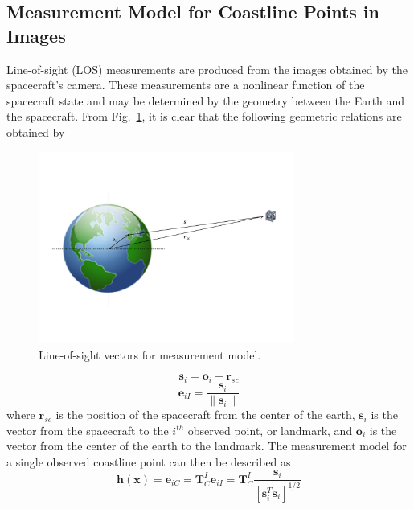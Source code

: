 \documentclass[]{aiaa-tc}%
\begin{document}

\subsection{Measurement Model for Coastline Points in Images} \label{ref:MeasModel}
Line-of-sight (LOS) measurements are produced from the images obtained by the spacecraft's camera.  These measurements are a nonlinear function of the spacecraft state and may be determined by the geometry between the Earth and the spacecraft.  From Fig.~\ref{fig:LOSgeometry}, it is clear that the following geometric relations are obtained by
\begin{figure}[t!]
	\centering
	\includegraphics[width=0.75\textwidth,trim=0.8in 1.5in 0.3in 1in,clip]{LOSgeometry} %
	\caption{Line-of-sight vectors for measurement model.}
	\label{fig:LOSgeometry}
\end{figure}
\begin{equation} \label{eq:s}
\textbf{s}_i=\textbf{o}_i-\textbf{r}_{sc}
\end{equation}
%
\begin{equation} \label{eq:eii}
\textbf{e}_{iI}=\frac{\textbf{s}_i}{\|\textbf{s}_i\|}
\end{equation}
%
where $\textbf{r}_{sc}$ is the position of the spacecraft from the center of the earth, $\textbf{s}_i$ is the vector from the spacecraft to the $i^{th}$ observed point, or landmark, and $\textbf{o}_i$ is the vector from the center of the earth to the landmark.  The measurement model for a single observed coastline point can then be described as
%
\begin{equation} \label{eq:littleh}
\textbf{h}(\textbf{x})=\textbf{e}_{iC}=\textbf{T}_{C}^I\textbf{e}_{iI}=\textbf{T}_{C}^I\frac{\textbf{s}_i}{[\textbf{s}_i^T\textbf{s}_i]^{1/2}}
\end{equation}
\end{document}
